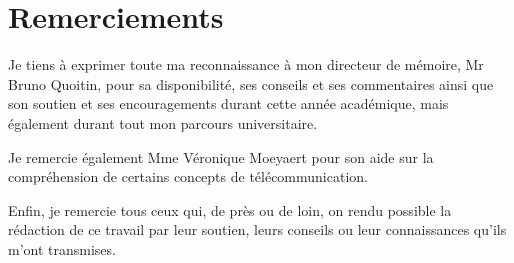 \documentclass[12pt,a4paper,oneside, titlepage]{report}
\begin{document}
{}
\chapter*{Remerciements}
\renewcommand{\leftmark}{REMERCIEMENTS}

Je tiens à exprimer toute ma reconnaissance à mon directeur de mémoire, Mr Bruno Quoitin, pour sa disponibilité, ses conseils et ses commentaires ainsi que son soutien et ses encouragements durant cette année académique, mais également durant tout mon parcours universitaire.

\vspace{0.1cm}

Je remercie également Mme Véronique Moeyaert pour son aide sur la compré\-hension de certains concepts de télécommunication.

\vspace{0.1cm}

Enfin, je remercie tous ceux qui, de près ou de loin, on rendu possible la rédaction de ce travail par leur soutien, leurs conseils ou leur connaissances qu'ils m'ont transmises.

\newpage
\renewcommand{\leftmark}{TABLE DES MATI\`{E}RES}
\thispagestyle{fancy}
\tableofcontents
{}

















\newpage
\appendix
{}



\end{document}
